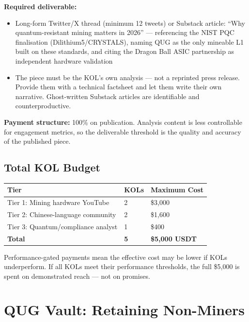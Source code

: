 \documentclass[11pt,a4paper]{article}
\begin{document}
\textbf{Required deliverable:}
\begin{itemize}[leftmargin=1em, itemsep=0pt]
  \item Long-form Twitter/X thread (minimum 12 tweets) or Substack article: ``Why quantum-resistant mining matters in 2026'' — referencing the NIST PQC finalisation (Dilithium5/CRYSTALS), naming QUG as the only mineable L1 built on these standards, and citing the Dragon Ball ASIC partnership as independent hardware validation
  \item The piece must be the KOL's own analysis — not a reprinted press release. Provide them with a technical factsheet and let them write their own narrative. Ghost-written Substack articles are identifiable and counterproductive.
\end{itemize}

\textbf{Payment structure:} 100\% on publication. Analysis content is less controllable for engagement metrics, so the deliverable threshold is the quality and accuracy of the published piece.

\subsection{Total KOL Budget}

\begin{center}
\begin{tabular}{L{6cm} C{2.5cm} C{2.5cm}}
  \toprule
  \textbf{Tier} & \textbf{KOLs} & \textbf{Maximum Cost} \\
  \midrule
  Tier 1: Mining hardware YouTube & 2 & \$3,000 \\
  Tier 2: Chinese-language community & 2 & \$1,600 \\
  Tier 3: Quantum/compliance analyst & 1 & \$400 \\
  \midrule
  \textbf{Total} & \textbf{5} & \textbf{\$5,000 USDT} \\
  \bottomrule
\end{tabular}
\end{center}

Performance-gated payments mean the effective cost may be lower if KOLs underperform. If all KOLs meet their performance thresholds, the full \$5,000 is spent on demonstrated reach — not on promises.

\section{QUG Vault: Retaining Non-Miners}
\label{sec:vault}
\end{document}
